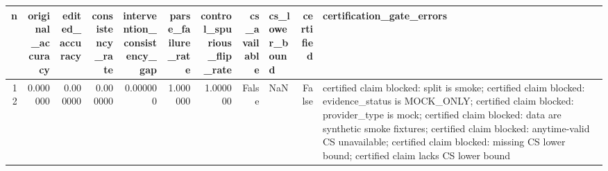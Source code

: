 \begin{tabular}{rrrrrrrrlrl}
\toprule
n & original_accuracy & edited_accuracy & consistency_rate & intervention_consistency_gap & parse_failure_rate & control_spurious_flip_rate & cs_available & cs_lower_bound & certified & certification_gate_errors \\
\midrule
12 & 0.000000 & 0.000000 & 0.000000 & 0.000000 & 1.000000 & 1.000000 & False & NaN & False & certified claim blocked: split is smoke; certified claim blocked: evidence_status is MOCK_ONLY; certified claim blocked: provider_type is mock; certified claim blocked: data are synthetic smoke fixtures; certified claim blocked: anytime-valid CS unavailable; certified claim blocked: missing CS lower bound; certified claim lacks CS lower bound \\
\bottomrule
\end{tabular}
